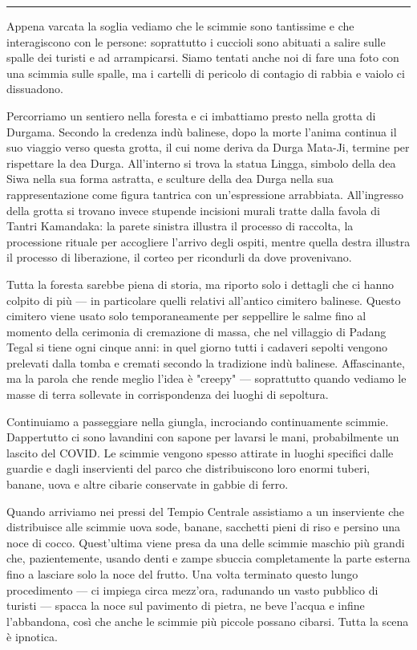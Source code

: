 \begin{center}
    \noindent\rule{0.6\textwidth}{0.4pt}
\end{center}

Appena varcata la soglia vediamo che le scimmie sono tantissime e che interagiscono con le persone: soprattutto i cuccioli sono abituati a salire sulle spalle dei turisti e ad arrampicarsi. Siamo tentati anche noi di fare una foto con una scimmia sulle spalle, ma i cartelli di pericolo di contagio di rabbia e vaiolo ci dissuadono.

Percorriamo un sentiero nella foresta e ci imbattiamo presto nella grotta di Durgama. Secondo la credenza indù balinese, dopo la morte l'anima continua il suo viaggio verso questa grotta, il cui nome deriva da Durga Mata-Ji, termine per rispettare la dea Durga. All'interno si trova la statua Lingga, simbolo della dea Siwa nella sua forma astratta, e sculture della dea Durga nella sua rappresentazione come figura tantrica con un'espressione arrabbiata. All'ingresso della grotta si trovano invece stupende incisioni murali tratte dalla favola di Tantri Kamandaka: la parete sinistra illustra il processo di raccolta, la processione rituale per accogliere l'arrivo degli ospiti, mentre quella destra illustra il processo di liberazione, il corteo per ricondurli da dove provenivano.

Tutta la foresta sarebbe piena di storia, ma riporto solo i dettagli che ci hanno colpito di più — in particolare quelli relativi all'antico cimitero balinese. Questo cimitero viene usato solo temporaneamente per seppellire le salme fino al momento della cerimonia di cremazione di massa, che nel villaggio di Padang Tegal si tiene ogni cinque anni: in quel giorno tutti i cadaveri sepolti vengono prelevati dalla tomba e cremati secondo la tradizione indù balinese. Affascinante, ma la parola che rende meglio l'idea è "creepy" — soprattutto quando vediamo le masse di terra sollevate in corrispondenza dei luoghi di sepoltura.

Continuiamo a passeggiare nella giungla, incrociando continuamente scimmie. Dappertutto ci sono lavandini con sapone per lavarsi le mani, probabilmente un lascito del COVID. Le scimmie vengono spesso attirate in luoghi specifici dalle guardie e dagli inservienti del parco che distribuiscono loro enormi tuberi, banane, uova e altre cibarie conservate in gabbie di ferro.

Quando arriviamo nei pressi del Tempio Centrale assistiamo a un inserviente che distribuisce alle scimmie uova sode, banane, sacchetti pieni di riso e persino una noce di cocco. Quest'ultima viene presa da una delle scimmie maschio più grandi che, pazientemente, usando denti e zampe sbuccia completamente la parte esterna fino a lasciare solo la noce del frutto. Una volta terminato questo lungo procedimento — ci impiega circa mezz'ora, radunando un vasto pubblico di turisti — spacca la noce sul pavimento di pietra, ne beve l'acqua e infine l'abbandona, così che anche le scimmie più piccole possano cibarsi. Tutta la scena è ipnotica.

